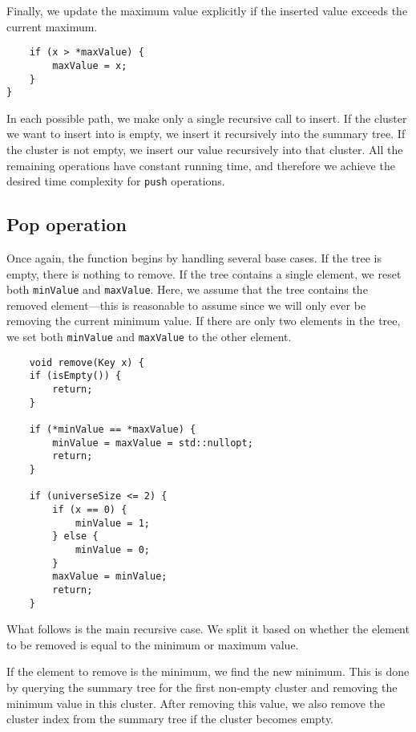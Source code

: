 Finally, we update the maximum value explicitly if the inserted value exceeds the current maximum.

\begin{verbatim}
    if (x > *maxValue) {
        maxValue = x;
    }
}
\end{verbatim}

In each possible path, we make only a single recursive call to insert. If the cluster we want to insert into is empty, we insert it recursively into the summary tree. If the cluster is not empty, we insert our value recursively into that cluster. All the remaining operations have constant running time, and therefore we achieve the desired time complexity for \texttt{push} operations.

\subsection{Pop operation}

Once again, the function begins by handling several base cases. If the tree is empty, there is nothing to remove. If the tree contains a single element, we reset both \texttt{minValue} and \texttt{maxValue}. Here, we assume that the tree contains the removed element—this is reasonable to assume since we will only ever be removing the current minimum value. If there are only two elements in the tree, we set both \texttt{minValue} and \texttt{maxValue} to the other element.

\begin{verbatim}
    void remove(Key x) {
    if (isEmpty()) {
        return;
    }

    if (*minValue == *maxValue) {
        minValue = maxValue = std::nullopt;
        return;
    }

    if (universeSize <= 2) {
        if (x == 0) {
            minValue = 1;
        } else {
            minValue = 0;
        }
        maxValue = minValue;
        return;
    }
\end{verbatim}

What follows is the main recursive case. We split it based on whether the element to be removed is equal to the minimum or maximum value.

If the element to remove is the minimum, we find the new minimum. This is done by querying the summary tree for the first non-empty cluster and removing the minimum value in this cluster. After removing this value, we also remove the cluster index from the summary tree if the cluster becomes empty.

